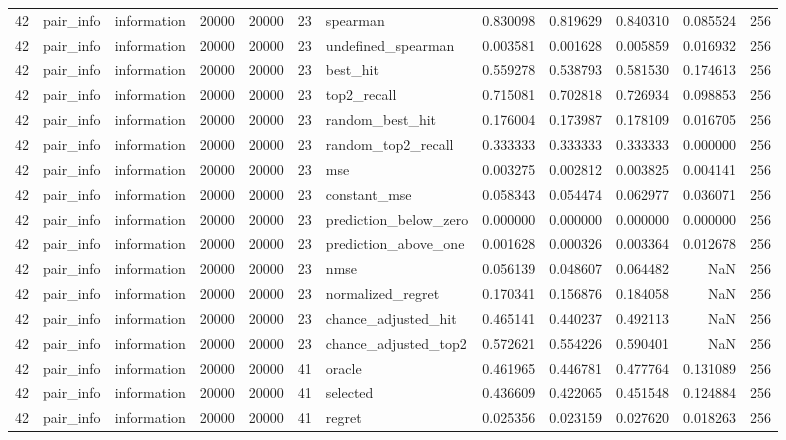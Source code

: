 \begin{tabular}{rllrrrlrrrrr}
42 & pair_info & information & 20000 & 20000 & 23 & spearman & 0.830098 & 0.819629 & 0.840310 & 0.085524 & 256 \\
42 & pair_info & information & 20000 & 20000 & 23 & undefined_spearman & 0.003581 & 0.001628 & 0.005859 & 0.016932 & 256 \\
42 & pair_info & information & 20000 & 20000 & 23 & best_hit & 0.559278 & 0.538793 & 0.581530 & 0.174613 & 256 \\
42 & pair_info & information & 20000 & 20000 & 23 & top2_recall & 0.715081 & 0.702818 & 0.726934 & 0.098853 & 256 \\
42 & pair_info & information & 20000 & 20000 & 23 & random_best_hit & 0.176004 & 0.173987 & 0.178109 & 0.016705 & 256 \\
42 & pair_info & information & 20000 & 20000 & 23 & random_top2_recall & 0.333333 & 0.333333 & 0.333333 & 0.000000 & 256 \\
42 & pair_info & information & 20000 & 20000 & 23 & mse & 0.003275 & 0.002812 & 0.003825 & 0.004141 & 256 \\
42 & pair_info & information & 20000 & 20000 & 23 & constant_mse & 0.058343 & 0.054474 & 0.062977 & 0.036071 & 256 \\
42 & pair_info & information & 20000 & 20000 & 23 & prediction_below_zero & 0.000000 & 0.000000 & 0.000000 & 0.000000 & 256 \\
42 & pair_info & information & 20000 & 20000 & 23 & prediction_above_one & 0.001628 & 0.000326 & 0.003364 & 0.012678 & 256 \\
42 & pair_info & information & 20000 & 20000 & 23 & nmse & 0.056139 & 0.048607 & 0.064482 & NaN & 256 \\
42 & pair_info & information & 20000 & 20000 & 23 & normalized_regret & 0.170341 & 0.156876 & 0.184058 & NaN & 256 \\
42 & pair_info & information & 20000 & 20000 & 23 & chance_adjusted_hit & 0.465141 & 0.440237 & 0.492113 & NaN & 256 \\
42 & pair_info & information & 20000 & 20000 & 23 & chance_adjusted_top2 & 0.572621 & 0.554226 & 0.590401 & NaN & 256 \\
42 & pair_info & information & 20000 & 20000 & 41 & oracle & 0.461965 & 0.446781 & 0.477764 & 0.131089 & 256 \\
42 & pair_info & information & 20000 & 20000 & 41 & selected & 0.436609 & 0.422065 & 0.451548 & 0.124884 & 256 \\
42 & pair_info & information & 20000 & 20000 & 41 & regret & 0.025356 & 0.023159 & 0.027620 & 0.018263 & 256 \\

\end{tabular}
